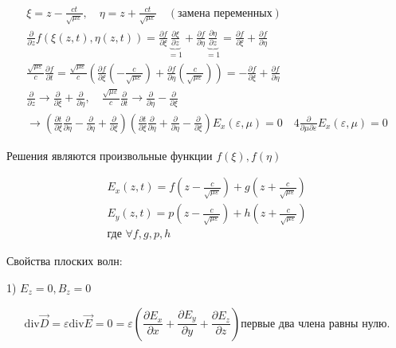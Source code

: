 \documentclass[12pt, a4paper]{report}
\begin{document}
\begin{gather*}
    \xi = z - \frac{c t}{ \sqrt{\mu \varepsilon} }, \quad \eta = z + \frac{c t}{ \sqrt{\mu \varepsilon} } \quad ( \text{замена переменных} )  \\
    \frac{\partial}{\partial z } f ( \xi ( z,t), \eta(z,t) ) = \frac{\partial f}{\partial \xi }  \underbrace{\frac{\partial \xi }{\partial z }}_{=1} + \frac{\partial f }{\partial \eta  }   \underbrace{\frac{\partial \eta }{\partial z }}_{=1}= \frac{\partial f}{\partial \xi } + \frac{\partial f}{ \partial \eta } \\
    \frac{\sqrt{\mu \varepsilon}}{c}  \frac{\partial f }{\partial t}      = \frac{\sqrt{\mu \varepsilon}}{c} \left( \frac{\partial f }{\partial \xi } \left( - \frac{c}{\sqrt{\mu \varepsilon}}\right) + \frac{\partial f}{\partial \eta } \left( \frac{c}{\sqrt{\mu \varepsilon}}  \right)  \right)=- \frac{\partial f}{\partial \xi } + \frac{\partial f}{ \partial \eta }  \\ 
    \frac{\partial}{\partial z } \to  \frac{\partial}{\partial \xi } + \frac{\partial}{\partial \eta }, \quad \frac{\sqrt{\mu \varepsilon}}{c}\frac{\partial}{\partial t} \to \frac{\partial}{\partial \eta }- \frac{\partial }{\partial \xi } \\
    \to \left( \frac{\partial t}{\partial \xi  } \frac{\partial}{\partial \eta } - \frac{\partial}{\partial \eta } + \frac{\partial}{\partial \xi  }     \right)\left( \frac{\partial t}{\partial \xi  } \frac{\partial}{\partial \eta } +\frac{\partial}{\partial \eta } - \frac{\partial}{\partial \xi } \right) E_x ( \varepsilon,\mu)= 0 \quad 4 \frac{\partial}{ \partial\mu \partial\varepsilon}E_x ( \varepsilon,\mu)= 0  
\end{gather*} 

Решения являются произвольные функции \( f(\xi) , f(\eta) \)

\begin{gather*}
    E_x (z,t) = f \left(z- \frac{c}{\sqrt{ \mu \varepsilon }}   \right)+ g \left(  z+ \frac{c}{\sqrt{ \mu \varepsilon }} \right) \\ 
    E_y (z,t) = p \left(z- \frac{c}{\sqrt{ \mu \varepsilon }}   \right)+ h \left(  z+ \frac{c}{\sqrt{ \mu \varepsilon }} \right) \\ 
    \text{где } \forall   f,g,p,h 
\end{gather*}

Свойства плоских волн: 

1) \( E_z = 0 , B_z =0  \) 

\[ \displaystyle  \mathrm{div}\vec{D}=\varepsilon \mathrm{div}\vec{E} =0 = \varepsilon \left( \frac{\partial E_x }{\partial x }+ \frac{\partial E_y }{\partial y }+\frac{\partial E_z }{\partial z }  \right) \text{первые два члена равны нулю.}    \]
\end{document}
